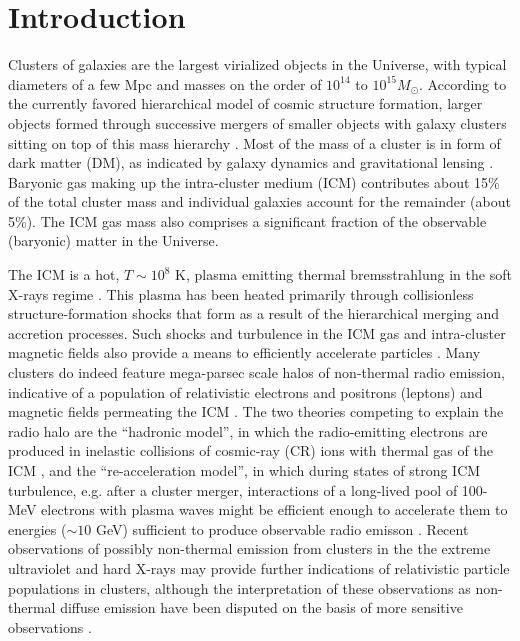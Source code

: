 \documentclass[12pt,manuscript]{aastex}
\begin{document}
\section{Introduction}
Clusters of galaxies are the largest virialized objects in the Universe, with typical diameters of
a few Mpc and masses on the order of $10^{14}$ to $10^{15} M_{\odot}$. According to the currently
favored hierarchical model of cosmic structure formation, larger objects formed through successive
mergers of smaller objects with galaxy clusters sitting on top of this mass hierarchy
\citep[see][for a review]{article:Voit:2005}. Most of the mass of a cluster is in form of dark
matter (DM), as indicated by galaxy dynamics and gravitational lensing
\citep{article:DiaferioSchindlerDolag:2008}. Baryonic gas making up the intra-cluster medium (ICM)
contributes about 15\% of the total cluster mass and individual galaxies account for the remainder
(about 5\%). The ICM gas mass also comprises a significant fraction of the observable (baryonic)
matter in the Universe.

The ICM is a hot, $T\sim 10^{8}$ K, plasma emitting thermal bremsstrahlung in the soft
X-rays regime \citep[see, e.g.,][]{article:Petrosian:2001}. This plasma has been heated
primarily through collisionless structure-formation shocks that form as a result of the
hierarchical merging and accretion processes. Such shocks and turbulence in the ICM gas and
intra-cluster magnetic fields also provide a means to efficiently accelerate particles \citep[see,
e.g.,][]{article:ColafrancescoBlasi:1998, article:Ryu_etal:2003}. Many clusters do indeed feature
mega-parsec scale halos of non-thermal radio emission, indicative of a population of relativistic
electrons and positrons (leptons) and magnetic fields permeating the ICM
\citep{article:Cassano_etal:2010}. The two theories competing to explain the radio halo
are the ``hadronic model'', in which the radio-emitting electrons are produced in inelastic
collisions of cosmic-ray (CR)  ions with thermal gas of the ICM \citep{article:Dennison:1980},
and the ``re-acceleration model'', in which during states of strong ICM turbulence, e.g. after a
cluster merger, interactions of a long-lived pool of 100-MeV electrons with plasma waves might
be efficient enough to accelerate them to energies ($\sim 10$ GeV) sufficient to produce observable
radio emisson \citep[][and references therein]{article:BrunettiLazarian:2010}. Recent observations of
possibly non-thermal emission from clusters in the the extreme ultraviolet
\citep[EUV; ][]{article:SarazinLieu:1998} and hard X-rays \citep{article:RephaeliGruber:2002, article:Fusco-Femiano_etal:2004, article:Eckert_etal:2007} may provide further indications of
relativistic particle populations in clusters, although the interpretation of these observations as non-thermal diffuse emission have been disputed on the basis of more sensitive observations
\citep[see, e.g.,][]{article:Ajello_etal:2009, article:Ajello_etal:2010, article:Wik_etal:2009}.
\end{document}

